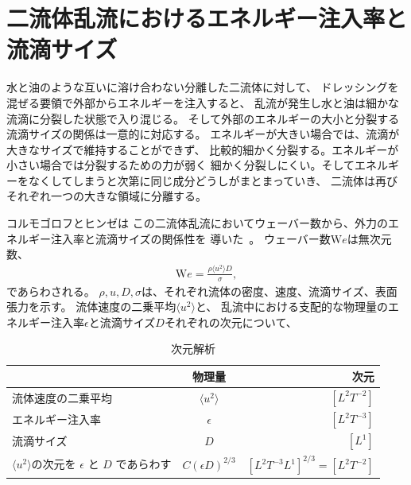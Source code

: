 \documentclass[12pt,a4paper]{jbook}
\begin{document}
		\section{二流体乱流におけるエネルギー注入率と流滴サイズ}
		水と油のような互いに溶け合わない分離した二流体に対して、
        ドレッシングを混ぜる要領で外部からエネルギーを注入すると、
        乱流が発生し水と油は細かな流滴に分裂した状態で入り混じる。
        そして外部のエネルギーの大小と分裂する流滴サイズの関係は一意的に対応する。
        エネルギーが大きい場合では、流滴が大きなサイズで維持することができず、
        比較的細かく分裂する。エネルギーが小さい場合では分裂するための力が弱く
        細かく分裂しにくい。そしてエネルギーをなくしてしまうと次第に同じ成分どうしがまとまっていき、
        二流体は再びそれぞれ一つの大きな領域に分離する。


        コルモゴロフとヒンゼは
        この二流体乱流においてウェーバー数から、外力のエネルギー注入率と流滴サイズの関係性を
		導いた~\cite{Kolmogorov49,Hinze}。
        ウェーバー数${\mathrm We}$は無次元数、
        \begin{eqnarray}
            \label{eq:weber}
            {\mathrm We} = \frac{\rho \langle u^2 \rangle D}{\sigma},
        \end{eqnarray}
        であらわされる。
        $\rho, u, D, \sigma$は、それぞれ流体の密度、速度、流滴サイズ、表面張力を示す。
        流体速度の二乗平均$\langle u^2 \rangle$と、
        乱流中における支配的な物理量のエネルギー注入率$\epsilon$と流滴サイズ$D$それぞれの次元について、
        \begin{table}[H]
            \caption{次元解析}
            \label{table:khdimension}
            \centering
            \begin{tabular}{lcr}
                \hline
                & 物理量 & 次元 
                \\
                \hline \hline
                流体速度の二乗平均 & $\langle u^2 \rangle$  & $[L^2 T^{-2}]$
                \\
                エネルギー注入率 & $\epsilon$ & $[L^2 T^{-3}]$
                \\
                流滴サイズ & $D$ & $[L^1]$
                \\
                $\langle u^2 \rangle$の次元を $\epsilon$ と $D$ であらわす & $C(\epsilon D)^{2/3}$ & $[L^2 T^{-3} L^1]^{2/3} = [L^2 T^{-2}]$
                \\
                \hline
            \end{tabular}
        \end{table}
\end{document}

